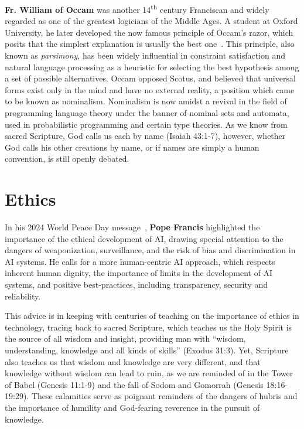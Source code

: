 \documentclass[sigplan,nonacm]{acmart}\settopmatter{printfolios=false,printccs=false,printacmref=false}
\begin{document}
\textbf{Fr. William of Occam} was another 14\textsuperscript{th} century Franciscan and widely regarded as one of the greatest logicians of the Middle Ages. A student at Oxford University, he later developed the now famous principle of Occam's razor, which posits that the simplest explanation is usually the best one~\cite{occam1495quaestiones}. This principle, also known as \textit{parsimony}, has been widely influential in constraint satisfaction and natural language processing as a heuristic for selecting the best hypothesis among a set of possible alternatives. Occam opposed Scotus, and believed that universal forms exist only in the mind and have no external reality, a position which came to be known as nominalism. Nominalism is now amidst a revival in the field of programming language theory under the banner of nominal sets and automata, used in probabilistic programming and certain type theories. As we know from sacred Scripture, God calls us each by name (Isaiah 43:1-7), however, whether God calls his other creations by name, or if names are simply a human convention, is still openly debated.

\section{Ethics}

In his 2024 World Peace Day message~\cite{catholic2024message}, \textbf{Pope Francis} highlighted the importance of the ethical development of AI, drawing special attention to the dangers of weaponization, surveillance, and the risk of bias and discrimination in AI systems. He calls for a more human-centric AI approach, which respects inherent human dignity, the importance of limits in the development of AI systems, and positive best-practices, including transparency, security and reliability.

This advice is in keeping with centuries of teaching on the importance of ethics in technology, tracing back to sacred Scripture, which teaches us the Holy Spirit is the source of all wisdom and insight, providing man with ``wisdom, understanding, knowledge and all kinds of skills'' (Exodus 31:3). Yet, Scripture also teaches us that wisdom and knowledge are very different, and that knowledge without wisdom can lead to ruin, as we are reminded of in the Tower of Babel (Genesis 11:1-9) and the fall of Sodom and Gomorrah (Genesis 18:16-19:29). These calamities serve as poignant reminders of the dangers of hubris and the importance of humility and God-fearing reverence in the pursuit of knowledge.
\end{document}
